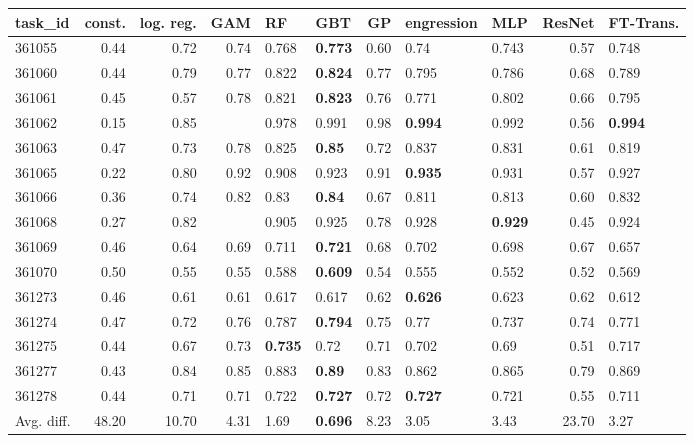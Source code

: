 \begin{table}[ht!]
\centering
\begingroup\footnotesize
\begin{tabular}{lrrrllrllrl}
  \hline
\hline
task\_id & const. & log. reg. & GAM & RF & GBT & GP & engression & MLP & ResNet & FT-Trans. \\ 
  \hline
361055 & 0.44 & 0.72 & 0.74 & 0.768 & \textbf{0.773} & 0.60 & 0.74 & 0.743 & 0.57 & 0.748 \\ 
  361060 & 0.44 & 0.79 & 0.77 & 0.822 & \textbf{0.824} & 0.77 & 0.795 & 0.786 & 0.68 & 0.789 \\ 
  361061 & 0.45 & 0.57 & 0.78 & 0.821 & \textbf{0.823} & 0.76 & 0.771 & 0.802 & 0.66 & 0.795 \\ 
  361062 & 0.15 & 0.85 &  & 0.978 & 0.991 & 0.98 & \textbf{0.994} & 0.992 & 0.56 & \textbf{0.994} \\ 
  361063 & 0.47 & 0.73 & 0.78 & 0.825 & \textbf{0.85} & 0.72 & 0.837 & 0.831 & 0.61 & 0.819 \\ 
  361065 & 0.22 & 0.80 & 0.92 & 0.908 & 0.923 & 0.91 & \textbf{0.935} & 0.931 & 0.57 & 0.927 \\ 
  361066 & 0.36 & 0.74 & 0.82 & 0.83 & \textbf{0.84} & 0.67 & 0.811 & 0.813 & 0.60 & 0.832 \\ 
  361068 & 0.27 & 0.82 &  & 0.905 & 0.925 & 0.78 & 0.928 & \textbf{0.929} & 0.45 & 0.924 \\ 
  361069 & 0.46 & 0.64 & 0.69 & 0.711 & \textbf{0.721} & 0.68 & 0.702 & 0.698 & 0.67 & 0.657 \\ 
  361070 & 0.50 & 0.55 & 0.55 & 0.588 & \textbf{0.609} & 0.54 & 0.555 & 0.552 & 0.52 & 0.569 \\ 
  361273 & 0.46 & 0.61 & 0.61 & 0.617 & 0.617 & 0.62 & \textbf{0.626} & 0.623 & 0.62 & 0.612 \\ 
  361274 & 0.47 & 0.72 & 0.76 & 0.787 & \textbf{0.794} & 0.75 & 0.77 & 0.737 & 0.74 & 0.771 \\ 
  361275 & 0.44 & 0.67 & 0.73 & \textbf{0.735} & 0.72 & 0.71 & 0.702 & 0.69 & 0.51 & 0.717 \\ 
  361277 & 0.43 & 0.84 & 0.85 & 0.883 & \textbf{0.89} & 0.83 & 0.862 & 0.865 & 0.79 & 0.869 \\ 
  361278 & 0.44 & 0.71 & 0.71 & 0.722 & \textbf{0.727} & 0.72 & \textbf{0.727} & 0.721 & 0.55 & 0.711 \\ 
   \hline
Avg. diff. & 48.20 & 10.70 & 4.31 & 1.69 & \textbf{0.696} & 8.23 & 3.05 & 3.43 & 23.70 & 3.27 \\ 

\end{tabular}
\end{table}
